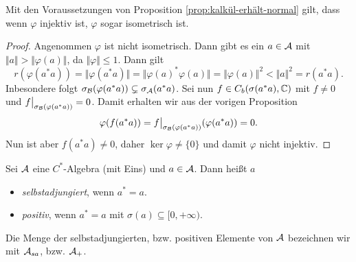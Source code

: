 \begin{corollary}
    Mit den Voraussetzungen von Proposition \ref{prop:kalkül-erhält-normal} gilt, dass wenn $\varphi$ injektiv ist, $\varphi$ sogar isometrisch ist.
\end{corollary}

\begin{proof}
    Angenommen $\varphi$ ist nicht isometrisch. Dann gibt es ein $a \in \mathcal{A}$ mit $\Vert a \Vert > \Vert \varphi(a) \Vert$, da $\Vert \varphi \Vert \leq 1$. Dann gilt
    $$ r(\varphi(a^* a)) = \Vert \varphi(a^* a) \Vert = \Vert \varphi(a)^* \varphi(a) \Vert = \Vert \varphi(a) \Vert^2 < \Vert a \Vert^2 = r(a^* a). $$
    Inbesondere folgt $\sigma_{\mathcal{B}} (\varphi(a^* a)) \subsetneq \sigma_{\mathcal{A}}(a^* a)$. Sei nun $f \in C_b(\sigma(a^* a), \mathbb{C})$ mit $f \neq 0$ und $\restr{f}{\sigma_\Ba (\varphi(a^* a))} = 0$. Damit erhalten wir aus der vorigen Proposition
    $$ \varphi(f(a^* a)) = \restr{f}{\sigma_\Ba(\varphi(a^* a))} (\varphi(a^* a)) = 0. $$
    Nun ist aber $f(a^* a) \neq 0$, daher $\ker \varphi \neq \{ 0 \}$ und damit $\varphi$ nicht injektiv.
\end{proof}

\begin{definition}
    Sei $\mathcal{A}$ eine $C^*$-Algebra (mit Eins) und $a \in \mathcal{A}$. Dann heißt $a$
    \begin{itemize}
        \item \emph{selbstadjungiert}, wenn $a^* = a$.
        \item \emph{positiv}, wenn $a^* = a$ mit $\sigma(a) \subseteq [0, +\infty)$.
    \end{itemize}
    Die Menge der selbstadjungierten, bzw. positiven Elemente von $\mathcal{A}$ bezeichnen wir mit $\mathcal{A}_{sa}$, bzw. $\mathcal{A}_+$.
\end{definition}

